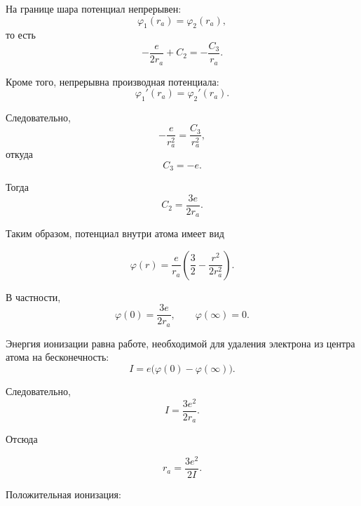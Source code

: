 \documentclass[../final.tex]{subfiles}
\begin{document}
На границе шара потенциал непрерывен:
%
\begin{equation*}
    \varphi_1(r_a)=\varphi_2(r_a),
\end{equation*}
%
то есть
%
\begin{equation*}
    -\frac{e}{2r_a}+C_2
    =
    -\frac{C_3}{r_a}.
\end{equation*}

Кроме того, непрерывна производная потенциала:
%
\begin{equation*}
    \varphi_1'(r_a)=\varphi_2'(r_a).
\end{equation*}

Следовательно,
%
\begin{equation*}
    -\frac{e}{r_a^2}
    =
    \frac{C_3}{r_a^2},
\end{equation*}
%
откуда
%
\begin{equation*}
    C_3=-e.
\end{equation*}

Тогда
%
\begin{equation*}
    C_2=\frac{3e}{2r_a}.
\end{equation*}

Таким образом, потенциал внутри атома имеет вид

\[
    \varphi(r)
    =
    \frac{e}{r_a}
    \left(
        \frac{3}{2}
        -
        \frac{r^2}{2r_a^2}
    \right).
\]

В частности,
%
\begin{equation*}
    \varphi(0)
    =
    \frac{3e}{2r_a},
    \qquad
    \varphi(\infty)=0.
\end{equation*}



Энергия ионизации равна работе, необходимой для удаления электрона
из центра атома на бесконечность:
%
\begin{equation*}
    I
    =
    e\bigl(
        \varphi(0)-\varphi(\infty)
    \bigr).
\end{equation*}

Следовательно,
%
\begin{equation*}
    I
    =
    \frac{3e^2}{2r_a}.
\end{equation*}

Отсюда

\[
    r_a
    =
    \frac{3e^2}{2I}.
\]

Положительная ионизация:
\end{document}
